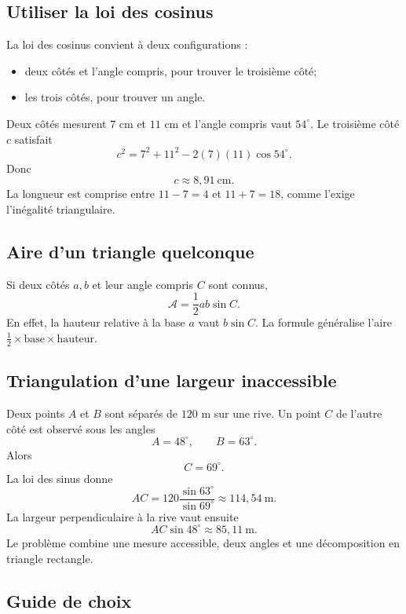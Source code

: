 \documentclass[12pt,a4paper,openany]{book}
\begin{document}
\subsection{Utiliser la loi des cosinus}

La loi des cosinus convient à deux configurations :
\begin{itemize}
\item deux côtés et l'angle compris, pour trouver le troisième côté;
\item les trois côtés, pour trouver un angle.
\end{itemize}

\begin{examplebox}
Deux côtés mesurent $7$ cm et $11$ cm et l'angle compris vaut $54^\circ$. Le troisième côté $c$ satisfait
\[
c^2=7^2+11^2-2(7)(11)\cos54^\circ.
\]
Donc
\[
c\approx8{,}91\ \mathrm{cm}.
\]
La longueur est comprise entre $11-7=4$ et $11+7=18$, comme l'exige l'inégalité triangulaire.
\end{examplebox}

\subsection{Aire d'un triangle quelconque}

Si deux côtés $a,b$ et leur angle compris $C$ sont connus,
\[
\mathcal A=\frac12ab\sin C.
\]
En effet, la hauteur relative à la base $a$ vaut $b\sin C$. La formule généralise l'aire $\frac12\times\text{base}\times\text{hauteur}$.

\subsection{Triangulation d'une largeur inaccessible}

Deux points $A$ et $B$ sont séparés de $120$ m sur une rive. Un point $C$ de l'autre côté est observé sous les angles
\[
A=48^\circ,
\qquad B=63^\circ.
\]
Alors
\[
C=69^\circ.
\]
La loi des sinus donne
\[
AC=120\frac{\sin63^\circ}{\sin69^\circ}\approx114{,}54\ \mathrm{m}.
\]
La largeur perpendiculaire à la rive vaut ensuite
\[
AC\sin48^\circ\approx85{,}11\ \mathrm{m}.
\]
Le problème combine une mesure accessible, deux angles et une décomposition en triangle rectangle.

\subsection{Guide de choix}
\end{document}
